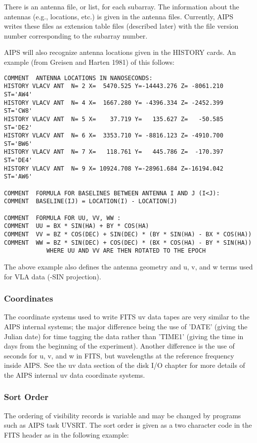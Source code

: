 There is an antenna file, or list, for each subarray.  The information
about the antennas (e.g., locations, etc.) is given in the antenna
files.  Currently, AIPS writes these files as extension table files
(described later) with the file version number corresponding to the
subarray number.

AIPS will also recognize antenna locations given in the HISTORY cards.
An example (from Greisen and Harten 1981) of this follows:
\begin{verbatim}
COMMENT  ANTENNA LOCATIONS IN NANOSECONDS:
HISTORY VLACV ANT  N= 2 X=  5470.525 Y=-14443.276 Z= -8061.210 ST='AW4'
HISTORY VLACV ANT  N= 4 X=  1667.280 Y= -4396.334 Z= -2452.399 ST='CW8'
HISTORY VLACV ANT  N= 5 X=    37.719 Y=   135.627 Z=   -50.585 ST='DE2'
HISTORY VLACV ANT  N= 6 X=  3353.710 Y= -8816.123 Z= -4910.700 ST='BW6'
HISTORY VLACV ANT  N= 7 X=   118.761 Y=   445.786 Z=  -170.397 ST='DE4'
HISTORY VLACV ANT  N= 9 X= 10924.708 Y=-28961.684 Z=-16194.042 ST='AW6'

COMMENT  FORMULA FOR BASELINES BETWEEN ANTENNA I AND J (I<J):
COMMENT  BASELINE(IJ) = LOCATION(I) - LOCATION(J)

COMMENT  FORMULA FOR UU, VV, WW :
COMMENT  UU = BX * SIN(HA) + BY * COS(HA)
COMMENT  VV = BZ * COS(DEC) + SIN(DEC) * (BY * SIN(HA) - BX * COS(HA))
COMMENT  WW = BZ * SIN(DEC) + COS(DEC) * (BX * COS(HA) - BY * SIN(HA))
            WHERE UU AND VV ARE THEN ROTATED TO THE EPOCH

\end{verbatim}
The above example also defines the antenna geometry and u, v, and w
terms used for VLA data (-SIN projection).

\subsubsection{Coordinates }
The coordinate systems used to write FITS uv data tapes are very
similar to the AIPS internal systems; the major difference being the
use of 'DATE' (giving the Julian date) for time tagging the data
rather than 'TIME1' (giving the time in days from the beginning of the
experiment). Another difference is the use of seconds for u, v, and w
in FITS, but wavelengths at the reference frequency inside AIPS. See
the uv data section of the disk I/O chapter for more details of the
AIPS internal uv data coordinate systems.

\subsubsection{Sort Order }
The ordering of visibility records is variable and may be changed by
programs such as AIPS task UVSRT.  The sort order is given as a two
character code in the FITS header as in the following example:

